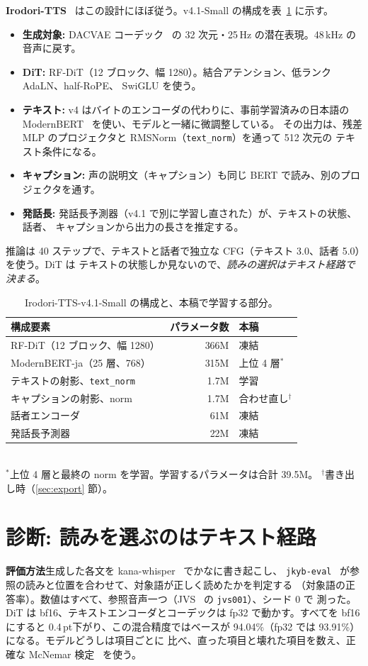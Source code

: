 \documentclass[10pt,a4paper,twocolumn]{article}
\newcommand{\pt}{\,pt}
\begin{document}
\textbf{Irodori-TTS}~\cite{irodori} はこの設計にほぼ従う。v4.1-Small の構成を表~\ref{tab:arch} に示す。
\begin{itemize}
\item \textbf{生成対象:} DACVAE コーデック~\cite{dacvae,dac} の 32 次元・25\,Hz の潜在表現。48\,kHz
  の音声に戻す。
\item \textbf{DiT:} RF-DiT（12 ブロック、幅 1280）。結合アテンション、低ランク AdaLN、half-RoPE、
  SwiGLU を使う。
\item \textbf{テキスト:} v4 はバイトのエンコーダの代わりに、事前学習済みの日本語の
  ModernBERT~\cite{modernbert,modernbertja} を使い、モデルと一緒に微調整している。
  その出力は、残差 MLP のプロジェクタと RMSNorm（\texttt{text\_norm}）を通って 512 次元の
  テキスト条件になる。
\item \textbf{キャプション:} 声の説明文（キャプション）も同じ BERT で読み、別のプロジェクタを通す。
\item \textbf{発話長:} 発話長予測器（v4.1 で別に学習し直された）が、テキストの状態、話者、
  キャプションから出力の長さを推定する。
\end{itemize}
推論は 40 ステップで、テキストと話者で独立な CFG（テキスト 3.0、話者 5.0）を使う。DiT は
テキストの状態しか見ないので、\emph{読みの選択はテキスト経路で決まる}。

\begin{table}[t]
\centering\footnotesize\setlength{\tabcolsep}{4pt}
\caption{Irodori-TTS-v4.1-Small の構成と、本稿で学習する部分。}
\label{tab:arch}
\begin{tabular}{@{}lrl@{}}
\toprule
構成要素 & パラメータ数 & 本稿\\
\midrule
RF-DiT（12 ブロック、幅 1280） & 366M & 凍結\\
ModernBERT-ja（25 層、768） & 315M & 上位 4 層$^\ast$\\
テキストの射影、\texttt{text\_norm} & 1.7M & 学習\\
キャプションの射影、norm & 1.7M & 合わせ直し$^\dagger$\\
話者エンコーダ & 61M & 凍結\\
発話長予測器 & 22M & 凍結\\
\bottomrule
\end{tabular}\\[2pt]
{\footnotesize $^\ast$上位 4 層と最終の norm を学習。学習するパラメータは合計 39.5M。
$^\dagger$書き出し時（\ref{sec:export} 節）。}
\end{table}

\section{診断: 読みを選ぶのはテキスト経路}\label{sec:diag}
\textbf{評価方法}\quad 生成した各文を kana-whisper~\cite{kanawhisper,whisper} でかなに書き起こし、
\texttt{jkyb-eval}~\cite{jkybp} が参照の読みと位置を合わせて、対象語が正しく読めたかを判定する
（対象語の正答率）。数値はすべて、参照音声一つ（JVS~\cite{jvs} の \texttt{jvs001}）、シード 0 で
測った。DiT は bf16、テキストエンコーダとコーデックは fp32 で動かす。すべてを bf16 にすると
0.4\pt 下がり、この混合精度ではベースが 94.04\%（fp32 では 93.91\%）になる。モデルどうしは項目ごとに
比べ、直った項目と壊れた項目を数え、正確な McNemar 検定~\cite{mcnemar} を使う。
\end{document}
